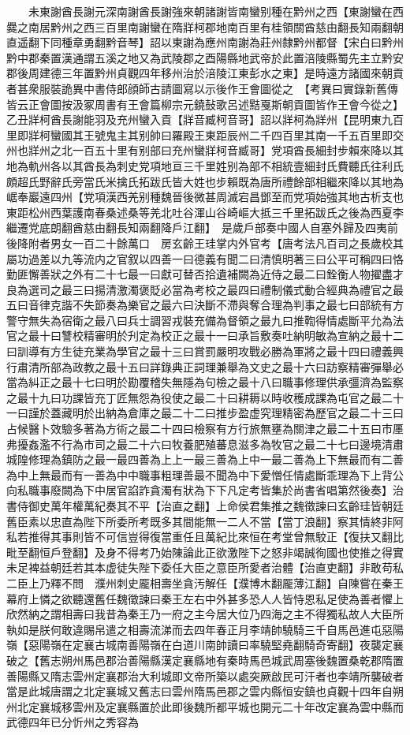 　　未東謝酋長謝元深南謝酋長謝強來朝諸謝皆南蠻别種在黔州之西【東謝蠻在西爨之南居黔州之西三百里南謝蠻在隋牂柯郡地南百里有桂領關酋慈由翻長知兩翻朝直遥翻下同種章勇翻黔音琴】詔以東謝為應州南謝為莊州隸黔州都督【宋白曰黔州黔中郡秦置漢通謂五溪之地又為武陵郡之酉陽縣地武帝於此置涪陵縣蜀先主立黔安郡後周建德三年置黔州貞觀四年移州治於涪陵江東彭水之東】是時遠方諸國來朝貢者甚衆服裝詭異中書侍郎顔師古請圖寫以示後作王會圖從之　【考異曰實錄新舊傳皆云正會圖按汲冢周書有王會篇柳宗元鐃鼔歌呂述黠戛斯朝貢圖皆作王會今從之】乙丑牂柯酋長謝能羽及充州蠻入貢【牂音臧柯音哥】詔以牂柯為牂州【昆明東九百里即牂柯蠻國其王號鬼主其别帥曰羅殿王東距辰州二千四百里其南一千五百里即交州也牂州之北一百五十里有别部曰充州蠻牂柯音臧哥】党項酋長細封步賴來降以其地為軌州各以其酋長為刺史党項地亘三千里姓别為部不相統壹細封氏費聽氏往利氏頗超氏野辭氏旁當氏米擒氏拓跋氏皆大姓也步賴既為唐所禮餘部相繼來降以其地為崌奉巖遠四州【党項漢西羌别種魏晉後微甚周滅宕昌鄧至而党項始強其地古析支也東距松州西葉護南春桑述桑等羌北吐谷渾山谷崎嶇大抵三千里拓跋氏之後為西夏李繼遷党底朗翻酋慈由翻長知兩翻降戶江翻】　是歲戶部奏中國人自塞外歸及四夷前後降附者男女一百二十餘萬口　房玄齡王珪掌内外官考【唐考法凡百司之長歲校其屬功過差以九等流内之官叙以四善一曰德義有聞二曰清慎明著三曰公平可稱四曰恪勤匪懈善狀之外有二十七最一曰獻可替否拾遺補闕為近侍之最二曰銓衡人物擢盡才良為選司之最三曰揚清激濁褒貶必當為考校之最四曰禮制儀式動合經典為禮官之最五曰音律克諧不失節奏為樂官之最六曰決斷不滯與奪合理為判事之最七曰部統有方警守無失為宿衛之最八曰兵士調習戎裝充備為督領之最九曰推鞫得情處斷平允為法官之最十曰讐校精審明於刋定為校正之最十一曰承旨敷奏吐納明敏為宣納之最十二曰訓導有方生徒充業為學官之最十三曰賞罰嚴明攻戰必勝為軍將之最十四曰禮義興行肅清所部為政教之最十五曰詳錄典正詞理兼舉為文史之最十六曰訪察精審彈舉必當為糾正之最十七曰明於勘覆稽失無隱為句檢之最十八曰職事修理供承彊濟為監察之最十九曰功課皆充丁匠無怨為役使之最二十曰耕耨以時收穫成課為屯官之最二十一曰謹於蓋藏明於出納為倉庫之最二十二曰推步盈虚究理精密為歷官之最二十三曰占候醫卜效驗多著為方術之最二十四曰檢察有方行旅無壅為關津之最二十五曰市㕓弗擾姦濫不行為市司之最二十六曰牧養肥殖蕃息滋多為牧官之最二十七曰邊境清肅城隍修理為鎮防之最一最四善為上上一最三善為上中一最二善為上下無最而有二善為中上無最而有一善為中中職事粗理善最不聞為中下愛憎任情處斷乖理為下上背公向私職事廢闕為下中居官諂詐貪濁有狀為下下凡定考皆集於尚書省唱第然後奏】治書侍御史萬年權萬紀奏其不平【治直之翻】上命侯君集推之魏徵諫曰玄齡珪皆朝廷舊臣素以忠直為陛下所委所考既多其間能無一二人不當【當丁浪翻】察其情終非阿私若推得其事則皆不可信豈得復當重任且萬紀比來恒在考堂曾無駮正【復扶又翻比毗至翻恒戶登翻】及身不得考乃始陳論此正欲激陛下之怒非竭誠徇國也使推之得實未足裨益朝廷若其本虚徒失陛下委任大臣之意臣所愛者治體【治直吏翻】非敢苟私二臣上乃釋不問　濮州刺史龎相壽坐貪汚解任【濮博木翻龎薄江翻】自陳嘗在秦王幕府上憐之欲聽還舊任魏徵諫曰秦王左右中外甚多恐人人皆恃恩私足使為善者懼上欣然納之謂相壽曰我昔為秦王乃一府之主今居大位乃四海之主不得獨私故人大臣所執如是朕何敢違賜帛遣之相壽流涕而去四年春正月李靖帥驍騎三千自馬邑進屯惡陽嶺【惡陽嶺在定襄古城南善陽嶺在白道川南帥讀曰率驍堅堯翻騎奇寄翻】夜襲定襄破之【舊志朔州馬邑郡治善陽縣漢定襄縣地有秦時馬邑城武周塞後魏置桑乾郡隋置善陽縣又隋志雲州定襄郡治大利城即文帝所築以處突厥啟民可汗者也李靖所襲破者當是此城唐謂之北定襄城又舊志曰雲州隋馬邑郡之雲内縣恒安鎮也貞觀十四年自朔州北定襄城移雲州及定襄縣置於此即後魏所都平城也開元二十年改定襄為雲中縣而武德四年已分忻州之秀容為